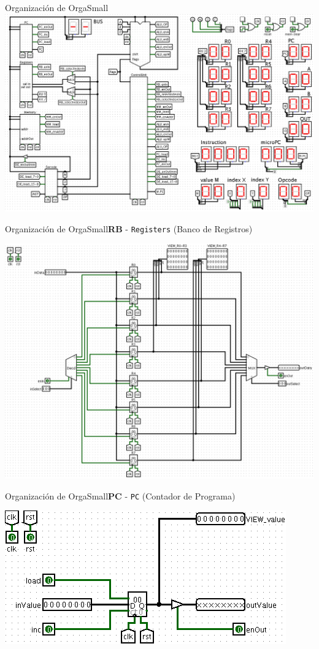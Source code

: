 \documentclass[aspectratio=169]{beamer}
\begin{document}
\begin{frame}[fragile,t]{Organización de OrgaSmall}
\includegraphics[scale=1.15]{img/0_dataPath.png}
\end{frame}

\begin{frame}[fragile,t]{Organización de OrgaSmall}{\textbf{RB} - \texttt{Registers} (Banco de Registros)}
    \begin{center} \includegraphics[scale=0.92]{img/1_registers.png} \end{center}
\end{frame}

\begin{frame}[fragile]{Organización de OrgaSmall}{\textbf{PC} - \texttt{PC} (Contador de Programa)}
    \begin{center} \includegraphics[scale=0.3]{img/2_PC.png} \end{center}
\end{frame}
\end{document}

